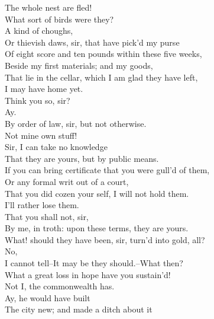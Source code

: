 \documentclass{memoir}
\begin{document}
\begin{drama*}
\mammonspeaks {} The whole nest are fled!\\
\lovewitspeaks  What sort of birds were they?\\
\mammonspeaks {} A kind of choughs,\\
 Or thievish daws, sir, that have pick'd my purse\\
 Of eight score and ten pounds within these five weeks,\\
 Beside my first materials; and my goods,\\
 That lie in the cellar, which I am glad they have left,\\
 I may have home yet.\\
\lovewitspeaks {} Think you so, sir?\\
\mammonspeaks {} Ay.\\
\lovewitspeaks  By order of law, sir, but not otherwise.\\
\mammonspeaks  Not mine own stuff!\\
\lovewitspeaks {} Sir, I can take no knowledge\\
 That they are yours, but by public means.\\
 If you can bring certificate that you were gull'd of them,\\
 Or any formal writ out of a court,\\
 That you did cozen your self, I will not hold them.\\
\mammonspeaks  I'll rather lose them.\\
\lovewitspeaks {} That you shall not, sir,\\
 By me, in troth: upon these terms, they are yours.\\
 What! should they have been, sir, turn'd into gold, all?\\
\mammonspeaks  No,\\
 I cannot tell--It may be they should.--What then?\\
\lovewitspeaks  What a great loss in hope have you sustain'd!\\
\mammonspeaks  Not I, the commonwealth has.\\
\facespeaks {} Ay, he would have built\\
 The city new; and made a ditch about it\\

\end{drama*}
\end{document}

